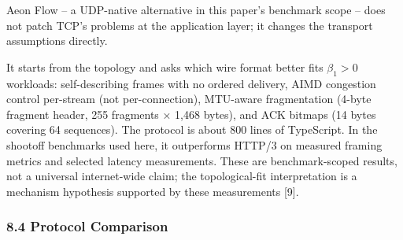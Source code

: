 \documentclass[
  11pt,
]{article}
\begin{document}
Aeon Flow -- a UDP-native alternative in this paper's benchmark scope --
does not patch TCP's problems at the application layer; it changes the
transport assumptions directly.

It starts from the topology and asks which wire format better fits
\(\beta_1 > 0\) workloads: self-describing frames with no ordered
delivery, AIMD congestion control per-stream (not per-connection),
MTU-aware fragmentation (4-byte fragment header, 255 fragments × 1,468
bytes), and ACK bitmaps (14 bytes covering 64 sequences). The protocol
is about 800 lines of TypeScript. In the shootoff benchmarks used here,
it outperforms HTTP/3 on measured framing metrics and selected latency
measurements. These are benchmark-scoped results, not a universal
internet-wide claim; the topological-fit interpretation is a mechanism
hypothesis supported by these measurements {[}9{]}.

\subsubsection{8.4 Protocol Comparison}\label{protocol-comparison}
\end{document}
